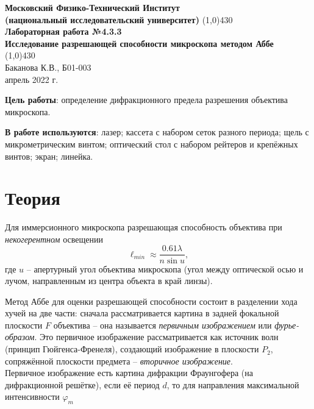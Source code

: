 \documentclass[a4paper, 12pt]{article}%
\begin{document}
\begin{titlepage}

\begin{center}
\large\textbf{Московский Физико-Технический Институт}\\
\large\textbf{(национальный исследовательский университет)}
\vfill
\line(1,0){430}\\[3mm]
\huge\textbf{Лабораторная работа №4.3.3}\\
\large\textbf{Исследование разрешающей способности микроскопа методом Аббе}\\
\line(1,0){430}\\[1mm]
\vfill
\large Баканова К.В., Б01-003\\
\large апрель 2022 г.\\
\end{center}

\end{titlepage}
\textbf{Цель работы}: определение дифракционного предела разрешения объектива микроскопа.

\textbf{       }

\textbf{В работе используются}: лазер; кассета с набором сеток разного периода; щель с микрометрическим винтом; оптический стол с набором рейтеров и крепёжных винтов; экран; линейка.

\textbf{       }

\section*{Теория}

Для иммерсионного микроскопа разрешающая способность объектива при \textit{некогерентном} освещении
\begin{equation}
\ell_{min} \approx \dfrac{0.61\lambda}{n \sin u},
\end{equation}
где $u$ -- апертурный угол объектива микроскопа (угол между оптической осью и лучом, направленным из центра объекта в край линзы).

\textbf{       }

Метод Аббе для оценки разрешающей способности состоит в разделении хода хучей на две части: сначала рассматривается картина в задней фокальной плоскости $F$ объектива -- она называется \textit{первичным изображением} или \textit{фурье-образом}. Это первичное изображение рассматривается как источник волн (принцип Гюйгенса-Френеля), создающий изображение в плоскости $P_2$, сопряжённой плоскости предмета -- \textit{вторичное изображение}.\\
Первичное изображение есть картина дифракции Фраунгофера (на дифракционной решётке), если её период $d$, то для направления максимальной интенсивности $\varphi_m$
\end{document}
